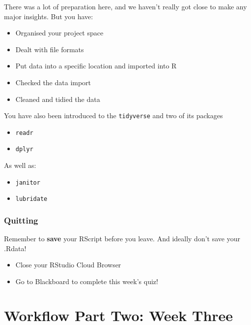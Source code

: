 \documentclass[
]{book}
\makeatletter
\newenvironment{kframe}{%
\medskip{}
\setlength{\fboxsep}{.8em}
 \def\at@end@of@kframe{}%
 \ifinner\ifhmode%
  \def\at@end@of@kframe{\end{minipage}}%
  \begin{minipage}{\columnwidth}%
 \fi\fi%
 \def\FrameCommand##1{\hskip\@totalleftmargin \hskip-\fboxsep
 \colorbox{shadecolor}{##1}\hskip-\fboxsep
     \hskip-\linewidth \hskip-\@totalleftmargin \hskip\columnwidth}%
 \MakeFramed {\advance\hsize-\width
   \@totalleftmargin\z@ \linewidth\hsize
   \@setminipage}}%
 {\par\unskip\endMakeFramed%
 \at@end@of@kframe}
\newenvironment{block}[1]
  {
  \begin{itemize}
  \renewcommand{\labelitemi}{
    \raisebox{-.7\height}[0pt][0pt]{
      {\setkeys{Gin}{width=3em,keepaspectratio}\texttt{[image: images/\#1]}}
    }
  }
  \setlength{\fboxsep}{1em}
  \begin{kframe}
  \item
  }
  {
  \end{kframe}
  \end{itemize}
  }
\newenvironment{rmdwarning}
  {\begin{block}{warning}}
  {\end{block}}
\makeatother
\begin{document}
There was a lot of preparation here, and we haven't really got close to make any major insights. But you have:

\begin{itemize}
\item
  Organised your project space
\item
  Dealt with file formats
\item
  Put data into a specific location and imported into R
\item
  Checked the data import
\item
  Cleaned and tidied the data
\end{itemize}

You have also been introduced to the \texttt{tidyverse} and two of its packages

\begin{itemize}
\item
  \texttt{readr} \citet{R-readr}
\item
  \texttt{dplyr} \citet{R-dplyr}
\end{itemize}

As well as:

\begin{itemize}
\item
  \texttt{janitor} \citet{R-janitor}
\item
  \texttt{lubridate} \citet{R-lubridate}
\end{itemize}

\hypertarget{quitting-1}{%
\subsection{Quitting}\label{quitting-1}}

\begin{rmdwarning}
Remember to \textbf{save} your RScript before you leave. And ideally
don't save your .Rdata!
\end{rmdwarning}

\begin{itemize}
\item
  Close your RStudio Cloud Browser
\item
  Go to Blackboard to complete this week's quiz!
\end{itemize}

\hypertarget{workflow-part-two-week-three}{%
\chapter{Workflow Part Two: Week Three}\label{workflow-part-two-week-three}}
\end{document}
